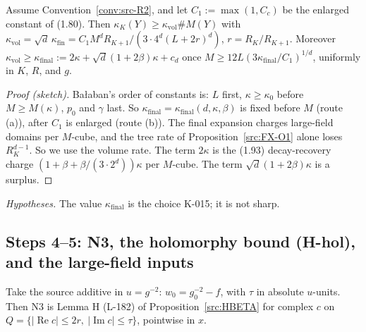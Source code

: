 \begin{proposition}\label{src:FX-R2}
Assume Convention~\ref{conv:src-R2}, and let $C_1:=\max(1,C_c)$ be the enlarged constant of (1.80). Then $\kappa_K(Y)\ge\kappa_{\mathrm{vol}}\#M(Y)$ with $\kappa_{\mathrm{vol}}=\sqrt d\,\kappa_{\mathrm{fin}}=C_1M^dR_{K+1}/(3\cdot4^d(L+2r)^d)$, $r=R_K/R_{K+1}$. Moreover $\kappa_{\mathrm{vol}}\ge\kappa_{\mathrm{final}}:=2\kappa+\sqrt d(1+2\beta)\kappa+c_d$ once $M\ge12L(3\kappa_{\mathrm{final}}/C_1)^{1/d}$, uniformly in $K$, $R$, and $g$.
\end{proposition}
\begin{proof}[Proof (sketch)]
Ba{\l}aban's order of constants is: $L$ first, $\kappa\ge\kappa_0$ before $M\ge M(\kappa)$, $p_0$ and $\gamma$ last. So $\kappa_{\mathrm{final}}=\kappa_{\mathrm{final}}(d,\kappa,\beta)$ is fixed before $M$ (route (a)), after $C_1$ is enlarged (route (b)). The final expansion charges large-field domains per $M$-cube, and the tree rate of Proposition~\ref{src:FX-O1} alone loses $R_K^{d-1}$. So we use the volume rate. The term $2\kappa$ is the (1.93) decay-recovery charge $(1+\beta+\beta/(3\cdot2^d))\kappa$ per $M$-cube. The term $\sqrt d(1+2\beta)\kappa$ is a surplus.
\end{proof}
\emph{Hypotheses.} The value $\kappa_{\mathrm{final}}$ is the choice K-015; it is not sharp.

\subsection{Steps 4--5: N3, the holomorphy bound (H-hol), and the large-field inputs}\label{sec:src-N3}

Take the source additive in $u=g^{-2}$: $w_0=g_0^{-2}-f$, with $\tau$ in absolute $u$-units. Then N3 is Lemma H (L-182) of Proposition~\ref{src:HBETA} for complex $c$ on $Q=\{|\operatorname{Re}c|\le2r,\ |\operatorname{Im}c|\le\tau\}$, pointwise in $x$.

